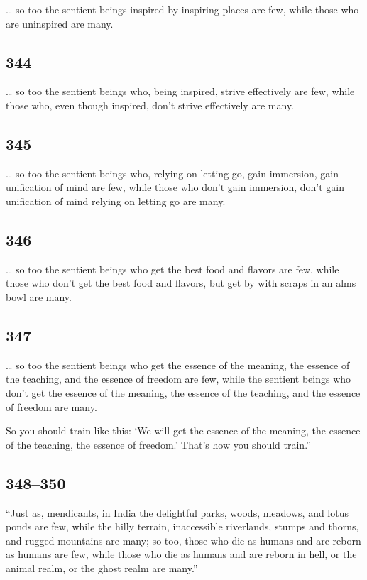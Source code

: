 \documentclass[12pt,openany]{book}%
\begin{document}
… so too the sentient beings inspired by inspiring places are few, while those who are uninspired are many. 

\subsection*{344 }

… so too the sentient beings who, being inspired, strive effectively are few, while those who, even though inspired, don’t strive effectively are many. 

\subsection*{345 }

… so too the sentient beings who, relying on letting go, gain immersion, gain unification of mind are few, while those who don’t gain immersion, don’t gain unification of mind relying on letting go are many. 

\subsection*{346 }

… so too the sentient beings who get the best food and flavors are few, while those who don’t get the best food and flavors, but get by with scraps in an alms bowl are many. 

\subsection*{347 }

… so too the sentient beings who get the essence of the meaning, the essence of the teaching, and the essence of freedom are few, while the sentient beings who don’t get the essence of the meaning, the essence of the teaching, and the essence of freedom are many. 

So you should train like this: ‘We will get the essence of the meaning, the essence of the teaching, the essence of freedom.’ That’s how you should train.” 

\subsection*{348–350 }

“Just as, mendicants, in India the delightful parks, woods, meadows, and lotus ponds are few, while the hilly terrain, inaccessible riverlands, stumps and thorns, and rugged mountains are many; so too, those who die as humans and are reborn as humans are few, while those who die as humans and are reborn in hell, or the animal realm, or the ghost realm are many.” 
\end{document}
